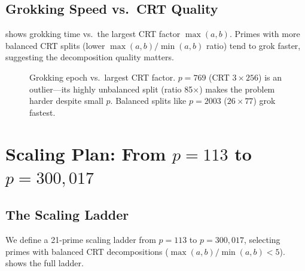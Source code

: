 \documentclass[11pt]{article}
\newcommand{\Tgrok}{T_{\mathrm{grok}}}
\begin{document}
\subsection{Grokking Speed vs.\ CRT Quality}

 shows grokking time vs.\ the largest CRT factor $\max(a, b)$. Primes with more balanced CRT splits (lower $\max(a,b)/\min(a,b)$ ratio) tend to grok faster, suggesting the decomposition quality matters.

\begin{figure}[t]
\centering
{}
\caption{Grokking epoch vs.\ largest CRT factor. $p = 769$ (CRT $3 \times 256$) is an outlier---its highly unbalanced split (ratio 85$\times$) makes the problem harder despite small $p$. Balanced splits like $p = 2003$ ($26 \times 77$) grok fastest.}
\label{fig:grok_speed}
\end{figure}



\section{Scaling Plan: From $p = 113$ to $p = 300{,}017$}
\label{sec:plan}

\subsection{The Scaling Ladder}

We define a 21-prime scaling ladder from $p = 113$ to $p = 300{,}017$, selecting primes with balanced CRT decompositions ($\max(a,b)/\min(a,b) < 5$).  shows the full ladder.
\end{document}
